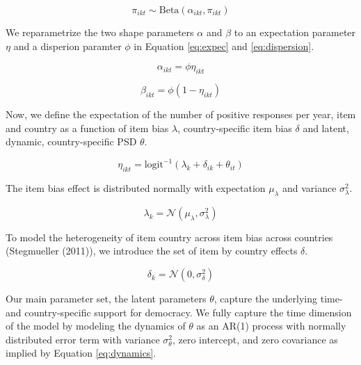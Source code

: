 \documentclass[12pt,english,a4paper,oneside]{article}
\theoremstyle{definition}
\theoremstyle{definition}
\theoremstyle{definition}
\theoremstyle{definition}
\theoremstyle{remark}
\begin{document}
\begin{equation}
\label{eq:prob-yes}
\pi_{ikt} \sim \text{Beta}(\alpha_{ikt}, \pi_{ikt})
\end{equation}

\noindent
We reparametrize the two shape parameters \(\alpha\) and \(\beta\) to an expectation parameter \(\eta\) and a disperion paramter \(\phi\) in Equation \eqref{eq:expec} and \eqref{eq:dispersion}.

\begin{equation}
\label{eq:expec}
\alpha_{ikt} = \phi \eta_{ikt}
\end{equation}

\begin{equation}
\label{eq:dispersion}
\beta_{ikt} = \phi (1 - \eta_{ikt})
\end{equation}

\noindent
Now, we define the expectation of the number of positive responses per year, item and country as a function of item bias \(\lambda\), country-specific item bias \(\delta\) and latent, dynamic, country-specific PSD \(\theta\).

\begin{equation}
\label{eq:latent-country-year}
\eta_{ikt} = \text{logit}^{-1}(\lambda_k + \delta_{ik} + \theta_{it})
\end{equation}

\noindent
The item bias effect is distributed normally with expectation \(\mu_{\lambda}\) and variance \(\sigma_{\lambda}^2\).

\begin{equation}
\label{eq:item-intercept}
\lambda_k = \mathcal{N}(\mu_{\lambda}, \sigma_{\lambda}^2)
\end{equation}

\noindent
To model the heterogeneity of item country across item bias across countries (Stegmueller (2011)), we introduce the set of item by country effects \(\delta\).

\begin{equation}
\label{eq:country-effects}
\delta_k = \mathcal{N}(0, \sigma_{\delta}^2)
\end{equation}

\noindent
Our main parameter set, the latent parameters \(\theta\), capture the underlying time- and country-specific support for democracy. We fully capture the time dimension of the model by modeling the dynamics of \(\theta\) as an AR(1) process with normally distributed error term with variance \(\sigma_{\theta}^2\), zero intercept, and zero covariance as implied by Equation \eqref{eq:dynamics}.
\end{document}

